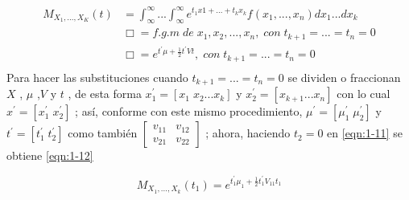 \begin{equation}
\begin{split}
M_{X_1,...,X_K}(t) &=\int^{\infty}_{\infty}...\int^{\infty}_{\infty}e^{t_1x1+...+t_kx_k}f(x_1,...,x_n)dx_1...dx_k\\
&\Box=f.g.m \;de\; x_1,x_2,...,x_n, \;con\; t_{k+1}=...=t_n=0\\
&\Box=e^{t^{\prime}\mu+\frac{1}{2}t^{\prime}Vt},\;con\;t_{k+1}=...=t_n=0\\
\end{split}
\label{eqn:1-11}
\end{equation}
Para hacer las substituciones cuando $t_{k+1}=...=t_n=0$   se dividen o fraccionan $X$ , $\mu$ ,$V$   y $t$ , de esta forma $x_1^{\prime}=[x_1\;x_2...x_k]$    y $x_2^{\prime}=[x_{k+1}...x_n]$ con lo cual $x^{\prime}=[x_1^{\prime}\;x_2^{\prime}]$ ;  así,  conforme con este mismo procedimiento, $\mu^{\prime}=[\mu_1^\prime\;\mu_2^{\prime}]$   y $t^{\prime}=[t_1^\prime\;t_2^{\prime}]$  como también $\begin{bmatrix}
v_{11} & v_{12}\\
v_{21} & v_{22} 
\end{bmatrix} $ ; ahora, haciendo $t_2=0$  en \ref{eqn:1-11} se obtiene \ref{eqn:1-12}

\begin{equation}
M_{X_1,...,X_k}(t_1)=e^{t_1^{\prime}\mu_1+\frac{1}{2}t_1^{\prime}V_{11}t_1}
    \label{eqn:1-12}
\end{equation}

